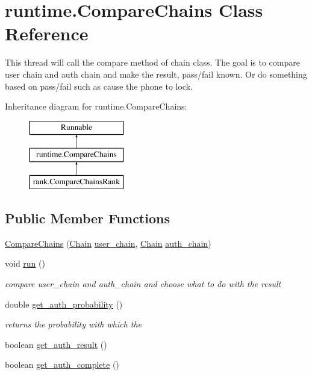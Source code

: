 \hypertarget{classruntime_1_1_compare_chains}{}\section{runtime.\+Compare\+Chains Class Reference}
\label{classruntime_1_1_compare_chains}


This thread will call the compare method of chain class. The goal is to compare user chain and auth chain and make the result, pass/fail known. Or do something based on pass/fail such as cause the phone to lock.  


Inheritance diagram for runtime.\+Compare\+Chains\+:\begin{figure}[H]
\begin{center}
\leavevmode
\includegraphics[height=3.000000cm]{classruntime_1_1_compare_chains}
\end{center}
\end{figure}
\subsection*{Public Member Functions}
\begin{DoxyCompactItemize}
\item 
\hyperlink{classruntime_1_1_compare_chains_ae471eeb5d3db8b8e48784d86d5a14a44}{Compare\+Chains} (\hyperlink{classcomponents_1_1_chain}{Chain} \hyperlink{classruntime_1_1_compare_chains_ab222c09ed48638554987292979ede005}{user\+\_\+chain}, \hyperlink{classcomponents_1_1_chain}{Chain} \hyperlink{classruntime_1_1_compare_chains_ac78b36bc65a64fd14906685e6d9410a9}{auth\+\_\+chain})
\item 
void \hyperlink{classruntime_1_1_compare_chains_aafa4a766a30bbbb6e205114a699d8158}{run} ()
\begin{DoxyCompactList}\small\item\em compare user\+\_\+chain and auth\+\_\+chain and choose what to do with the result \end{DoxyCompactList}\item 
double \hyperlink{classruntime_1_1_compare_chains_a684e7b6b0ea4f599a190866647acd144}{get\+\_\+auth\+\_\+probability} ()
\begin{DoxyCompactList}\small\item\em returns the probability with which the \end{DoxyCompactList}\item 
boolean \hyperlink{classruntime_1_1_compare_chains_af5dd0a0034121d92bbfac68adecec1c7}{get\+\_\+auth\+\_\+result} ()
\item 
boolean \hyperlink{classruntime_1_1_compare_chains_a3e4a09371bcb8d006d646f9c58b5596c}{get\+\_\+auth\+\_\+complete} ()
\end{DoxyCompactItemize}

